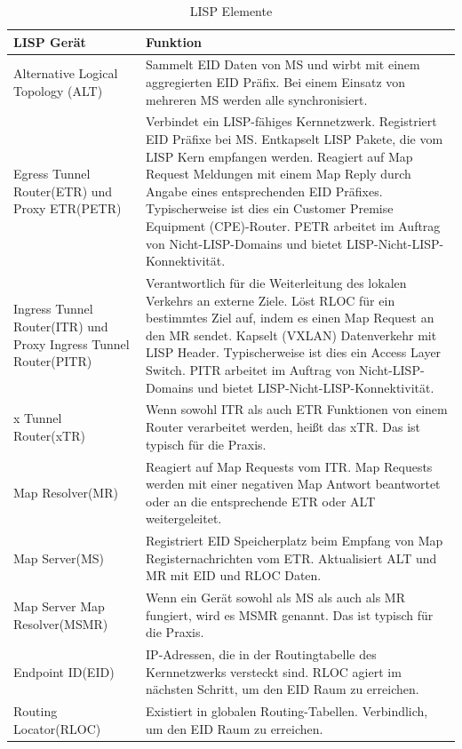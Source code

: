 \begin{table}[H]
	\centering
	\begin{tabularx}{\textwidth}{p{6.6cm} | X}
		\rowcolor{gray!50}
		\textbf{LISP Gerät} & \textbf{Funktion} \\
		\hline	
		Alternative Logical Topology (ALT) & Sammelt EID Daten von MS und wirbt mit einem aggregierten EID Präfix. Bei einem Einsatz von mehreren MS werden alle synchronisiert. \\
		
		Egress Tunnel Router(ETR) und Proxy ETR(PETR) & Verbindet ein LISP-fähiges Kernnetzwerk. Registriert EID Präfixe bei MS. Entkapselt LISP Pakete, die vom LISP Kern empfangen werden. Reagiert auf Map Request Meldungen mit einem Map Reply durch Angabe eines entsprechenden EID Präfixes. Typischerweise ist dies ein Customer Premise Equipment (CPE)-Router. PETR arbeitet im Auftrag von Nicht-LISP-Domains und bietet LISP-Nicht-LISP-Konnektivität. \\ 
		
		Ingress Tunnel Router(ITR) und Proxy Ingress Tunnel Router(PITR) & Verantwortlich für die Weiterleitung des lokalen Verkehrs an externe Ziele. Löst RLOC für ein bestimmtes Ziel auf, indem es einen Map Request an den MR sendet. Kapselt (VXLAN) Datenverkehr mit LISP Header. Typischerweise ist dies ein Access Layer Switch. PITR arbeitet im Auftrag von Nicht-LISP-Domains und bietet LISP-Nicht-LISP-Konnektivität. \\
		
		x Tunnel Router(xTR) & Wenn sowohl ITR als auch ETR Funktionen von einem Router verarbeitet werden, heißt das xTR. Das ist typisch für die Praxis. \\
		
		Map Resolver(MR) & Reagiert auf Map Requests vom ITR. Map Requests werden mit einer negativen Map Antwort beantwortet oder an die entsprechende ETR oder ALT weitergeleitet. \\
		
		Map Server(MS) & Registriert EID Speicherplatz beim Empfang von Map Registernachrichten vom ETR. Aktualisiert ALT und MR mit EID und RLOC Daten. \\
		
		Map Server Map Resolver(MSMR) & Wenn ein Gerät sowohl als MS als auch als MR fungiert, wird es MSMR genannt. Das ist typisch für die Praxis. \\
		
		Endpoint ID(EID) & IP-Adressen, die in der Routingtabelle des Kernnetzwerks versteckt sind. RLOC agiert im nächsten Schritt, um den EID Raum zu erreichen. \\
		
		Routing Locator(RLOC) & Existiert in globalen Routing-Tabellen. Verbindlich, um den EID Raum zu erreichen. \\
		
	\end{tabularx}
	\caption{LISP Elemente \cite{lisp-overview}}
	\label{tab:LISP Elemente}
\end{table}

